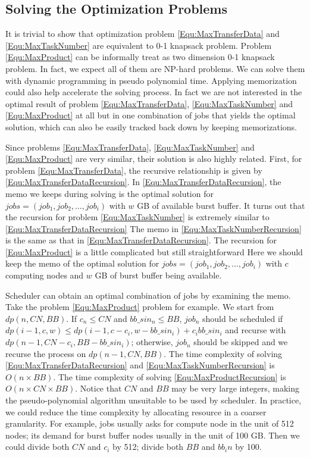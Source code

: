 \subsection{Solving the Optimization Problems}
It is trivial to show that optimization problem \ref{Equ:MaxTransferData} and \ref{Equ:MaxTaskNumber}
are equivalent to 0-1 knapsack problem.
Problem \ref{Equ:MaxProduct} can be informally treat as two dimension 0-1 knapsack problem.
In fact, we expect all of them are NP-hard problems.
We can solve them with dynamic programming in pseudo polynomial time.
Applying memorization could also help accelerate the solving process.
In fact we are not interested in the optimal result of problem \ref{Equ:MaxTransferData},
\ref{Equ:MaxTaskNumber} and \ref{Equ:MaxProduct} at all but in one combination of jobs
that yields the optimal solution, which can also be easily tracked back down by keeping memorizations.

Since problems \ref{Equ:MaxTransferData},
\ref{Equ:MaxTaskNumber} and \ref{Equ:MaxProduct} are very similar, 
their solution is also highly related.
First, for problem \ref{Equ:MaxTransferData}, the recursive relationship is given by \ref{Equ:MaxTransferDataRecursion}.
In \ref{Equ:MaxTransferDataRecursion}, the memo we keeps during solving is the optimal solution for 
$jobs=(job_1, job_2, \ldots, job_i)$ with $w$ GB of available burst buffer.
It turns out that the recursion for problem \ref{Equ:MaxTaskNumber} is extremely similar to \ref{Equ:MaxTransferDataRecursion}
The memo in \ref{Equ:MaxTaskNumberRecursion} is the same as that in \ref{Equ:MaxTransferDataRecursion}.
The recursion for \ref{Equ:MaxProduct} is a little complicated but still straightforward
Here we should keep the memo of the optimal solution for $jobs=(job_1, job_2, \ldots, job_i)$
with $c$ computing nodes and $w$ GB of burst buffer being available.

Scheduler can obtain an optimal combination of jobs by examining the memo.
Take the problem \ref{Equ:MaxProduct} problem for example.
We start from $dp(n, CN, BB)$.
If $c_n \leq CN$ and $bb\_sin_n \leq BB$, $job_n$ should be scheduled if
$dp(i-1, c, w) \leq dp(i-1, c - c_i, w-bb\_sin_i) + c_i bb\_sin_i$ and recurse with $dp(n-1, CN-c_i, BB-bb\_sin_i)$;
otherwise, $job_n$ should be skipped and we recurse the process on $dp(n-1, CN, BB)$.
The time complexity of solving \ref{Equ:MaxTransferDataRecursion} and \ref{Equ:MaxTaskNumberRecursion} is $O(n\times BB)$.
The time complexity of solving \ref{Equ:MaxProductRecursion} is $O(n\times CN\times BB)$.
Notice that $CN$ and $BB$ may be very large integers, making the pseudo-polynomial algorithm unsuitable
to be used by scheduler.
In practice, we could reduce the time complexity by allocating resource in a coarser granularity.
For example, jobs usually asks for compute node in the unit of 512 nodes;
its demand for burst buffer nodes usually in the unit of 100 GB.
Then we could divide both $CN$ and $c_i$ by 512; divide both $BB$ and $bb_in$ by 100.


